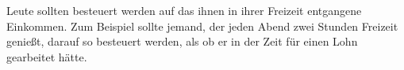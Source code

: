 Leute sollten besteuert werden auf das ihnen in ihrer Freizeit entgangene Einkommen.
Zum Beispiel sollte jemand, der jeden Abend zwei Stunden Freizeit genießt, darauf so besteuert werden, als ob er in der Zeit für einen Lohn gearbeitet hätte.